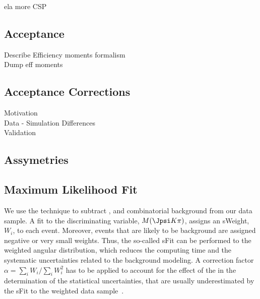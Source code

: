 ela more CSP

\subsection{Acceptance}

Describe Efficiency moments formalism\\
Dump eff moments\\

\subsection{Acceptance Corrections}
Motivation\\
Data - Simulation Differences\\
Validation\\
\subsection{\CP Assymetries}
\subsection{Maximum Likelihood Fit}

We use the \sPlot technique to subtract \LbJpsippi, and combinatorial background from our data sample. 
A fit to the discriminating variable, $M(\Jpsi K\pi)$, assigns an sWeight, $W_i$, to each event. 
Moreover, events that are likely to be background are assigned negative or very small weights. 
Thus, the so-called sFit can be performed to the weighted angular distribution, which reduces the 
computing time and the systematic uncertainties related to the background modeling. A correction 
factor $\alpha = \sum_{i} W_i /\sum_{i} W_i^2$  has to 
be applied to account for the effect of the \sWeights in the determination of the statistical uncertainties, 
that are usually underestimated by the sFit to the weighted data sample~\cite{Pivk:2004ty}.

